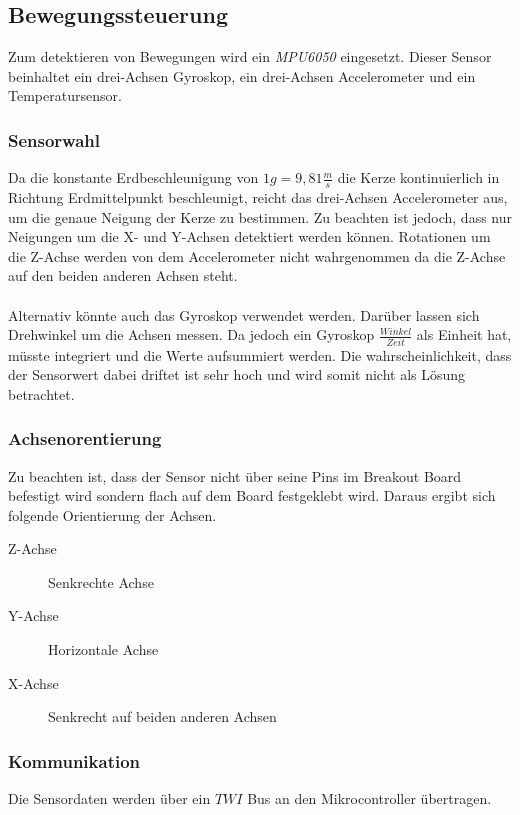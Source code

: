 \subsection{Bewegungssteuerung}
  Zum detektieren von Bewegungen wird ein \textit{MPU6050} eingesetzt.
  Dieser Sensor beinhaltet ein drei-Achsen Gyroskop, ein drei-Achsen 
  Accelerometer und ein Temperatursensor.

    \subsubsection{Sensorwahl}
      Da die konstante Erdbeschleunigung von $1g = 9,81\frac{m}{s}$
      die Kerze kontinuierlich in Richtung Erdmittelpunkt beschleunigt,
      reicht das drei-Achsen Accelerometer aus, um die genaue
      Neigung der Kerze zu bestimmen. Zu beachten ist jedoch, dass nur
      Neigungen um die X- und Y-Achsen detektiert werden können.
      Rotationen um die Z-Achse werden von dem Accelerometer nicht
      wahrgenommen da die Z-Achse auf den beiden anderen Achsen steht.
      \\\\
      Alternativ könnte auch das Gyroskop verwendet werden. Darüber lassen
      sich Drehwinkel um die Achsen messen. Da jedoch ein Gyroskop
      $\frac{Winkel}{Zeit}$ als Einheit hat, müsste integriert und die Werte
      aufsummiert werden. Die wahrscheinlichkeit, dass der Sensorwert dabei
      driftet ist sehr hoch und wird somit nicht als Lösung betrachtet.


    \subsubsection{Achsenorentierung}\label{Achsenorentierung}
      Zu beachten ist, dass der Sensor nicht über seine Pins im
      Breakout Board befestigt wird sondern flach auf dem Board
      festgeklebt wird. Daraus ergibt sich folgende Orientierung der
      Achsen.
      \begin{description}       
          \item[Z-Achse] Senkrechte Achse
          \item[Y-Achse] Horizontale Achse
          \item[X-Achse] Senkrecht auf beiden anderen Achsen
      \end{description}



    \subsubsection{Kommunikation}
      Die Sensordaten werden über ein $TWI$ Bus an den Mikrocontroller
      übertragen.

